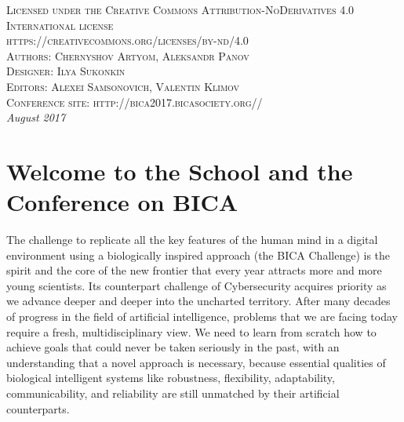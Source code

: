 \documentclass[10pt,fleqn,openany]{book} %
\begin{document}
\noindent \textsc{Licensed under the Creative Commons Attribution-NoDerivatives 4.0 International license}\\

\noindent \textsc{https://creativecommons.org/licenses/by-nd/4.0}\\

\noindent \textsc{Authors: Chernyshov Artyom, Aleksandr Panov}\\

\noindent \textsc{Designer: Ilya Sukonkin }\\

\noindent \textsc{Editors: Alexei Samsonovich, Valentin Klimov}\\

\noindent \textsc{Conference site: http://bica2017.bicasociety.org//}\\

\noindent \textit{August 2017}




\pagestyle{empty} %

\tableofcontents %

\pagestyle{fancy}



\chapter{Welcome to the School and the Conference on BICA}

The challenge to replicate all the key features of the human mind in a digital environment using a biologically inspired approach (the BICA Challenge) is the spirit and the core of the new frontier that every year attracts more and more young scientists. Its counterpart challenge of Cybersecurity acquires priority as we advance deeper and deeper into the uncharted territory. After many decades of progress in the field of artificial intelligence, problems that we are facing today require a fresh, multidisciplinary view. We need to learn from scratch how to achieve goals that could never be taken seriously in the past, with an understanding that a novel approach is necessary, because essential qualities of biological intelligent systems like robustness, flexibility, adaptability, communicability, and reliability are still unmatched by their artificial counterparts. 
\end{document}
